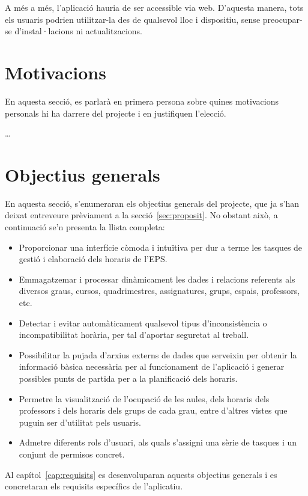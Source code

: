 \documentclass[a4paper,12pt]{ThesisStyle}
\begin{document}
A més a més, l'aplicació hauria de ser accessible via web. D'aquesta manera, tots els usuaris podrien utilitzar-la des de qualsevol lloc i dispositiu, sense preocupar-se d'instal·lacions ni actualitzacions.

\section{Motivacions}
\label{sec:motivacions}

En aquesta secció, es parlarà en primera persona sobre quines motivacions personals hi ha darrere del projecte i en justifiquen l'elecció.

\ldots

\section{Objectius generals}
\label{sec:objectius_generals}

En aquesta secció, s'enumeraran els objectius generals del projecte, que ja s'han deixat entreveure prèviament a la secció~\ref{sec:proposit}. No obstant això, a continuació se'n presenta la llista completa:
\begin{itemize}
  \item Proporcionar una interfície còmoda i intuïtiva per dur a terme les tasques de gestió i elaboració dels horaris de l'EPS.
  \item Emmagatzemar i processar dinàmicament les dades i relacions referents als diversos graus, cursos, quadrimestres, assignatures, grups, espais, professors, etc.
  \item Detectar i evitar automàticament qualsevol tipus d'inconsistència o incompatibilitat horària, per tal d'aportar seguretat al treball.
  \item Possibilitar la pujada d'arxius externs de dades que serveixin per obtenir la informació bàsica necessària per al funcionament de l'aplicació i generar possibles punts de partida per a la planificació dels horaris.
  \item Permetre la visualització de l'ocupació de les aules, dels horaris dels professors i dels horaris dels grups de cada grau, entre d'altres vistes que puguin ser d'utilitat pels usuaris.
  \item Admetre diferents rols d'usuari, als quals s'assigni una sèrie de tasques i un conjunt de permisos concret.
\end{itemize}

Al capítol~\ref{cap:requisits} es desenvoluparan aquests objectius generals i es concretaran els requisits específics de l'aplicatiu.
\end{document}

